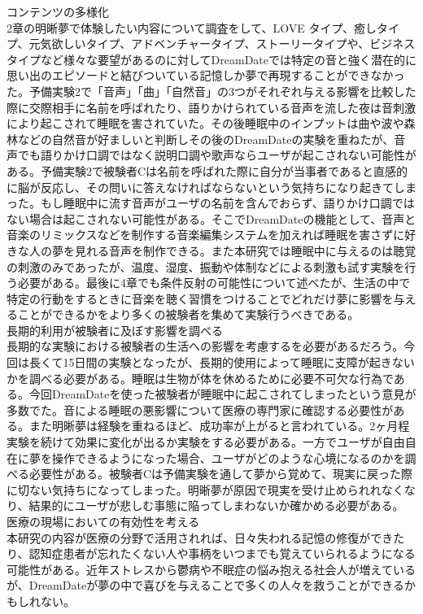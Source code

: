 コンテンツの多様化\\
2章の明晰夢で体験したい内容について調査をして、LOVE タイプ、癒しタイプ、元気欲しいタイプ、アドベンチャータイプ、ストーリータイプや、ビジネスタイプなど様々な要望があるのに対してDreamDateでは特定の音と強く潜在的に思い出のエピソードと結びついている記憶しか夢で再現することができなかった。予備実験2で「音声」「曲」「自然音」の3つがそれぞれ与える影響を比較した際に交際相手に名前を呼ばれたり、語りかけられている音声を流した夜は音刺激により起こされて睡眠を害されていた。その後睡眠中のインプットは曲や波や森林などの自然音が好ましいと判断しその後のDreamDateの実験を重ねたが、音声でも語りかけ口調ではなく説明口調や歌声ならユーザが起こされない可能性がある。予備実験2で被験者Cは名前を呼ばれた際に自分が当事者であると直感的に脳が反応し、その問いに答えなければならないという気持ちになり起きてしまった。もし睡眠中に流す音声がユーザの名前を含んでおらず、語りかけ口調ではない場合は起こされない可能性がある。そこでDreamDateの機能として、音声と音楽のリミックスなどを制作する音楽編集システムを加えれば睡眠を害さずに好きな人の夢を見れる音声を制作できる。また本研究では睡眠中に与えるのは聴覚の刺激のみであったが、温度、湿度、振動や体制などによる刺激も試す実験を行う必要がある。最後に4章でも条件反射の可能性について述べたが、生活の中で特定の行動をするときに音楽を聴く習慣をつけることでどれだけ夢に影響を与えることができるかをより多くの被験者を集めて実験行うべきである。\\

長期的利用が被験者に及ぼす影響を調べる\\
長期的な実験における被験者の生活への影響を考慮するを必要があるだろう。今回は長くて15日間の実験となったが、長期的使用によって睡眠に支障が起きないかを調べる必要がある。睡眠は生物が体を休めるために必要不可欠な行為である。今回DreamDateを使った被験者が睡眠中に起こされてしまったという意見が多数でた。音による睡眠の悪影響について医療の専門家に確認する必要性がある。また明晰夢は経験を重ねるほど、成功率が上がると言われている\cite{LaBerge}。2ヶ月程実験を続けて効果に変化が出るか実験をする必要がある。一方でユーザが自由自在に夢を操作できるようになった場合、ユーザがどのような心境になるのかを調べる必要性がある。被験者Cは予備実験を通して夢から覚めて、現実に戻った際に切ない気持ちになってしまった。明晰夢が原因で現実を受け止められれなくなり、結果的にユーザが悲しむ事態に陥ってしまわないか確かめる必要がある。\\

医療の現場においての有効性を考える\\
本研究の内容が医療の分野で活用されれば、日々失われる記憶の修復ができたり、認知症患者が忘れたくない人や事柄をいつまでも覚えていられるようになる可能性がある。近年ストレスから鬱病や不眠症の悩み抱える社会人が増えているが、DreamDateが夢の中で喜びを与えることで多くの人々を救うことができるかもしれない。\\